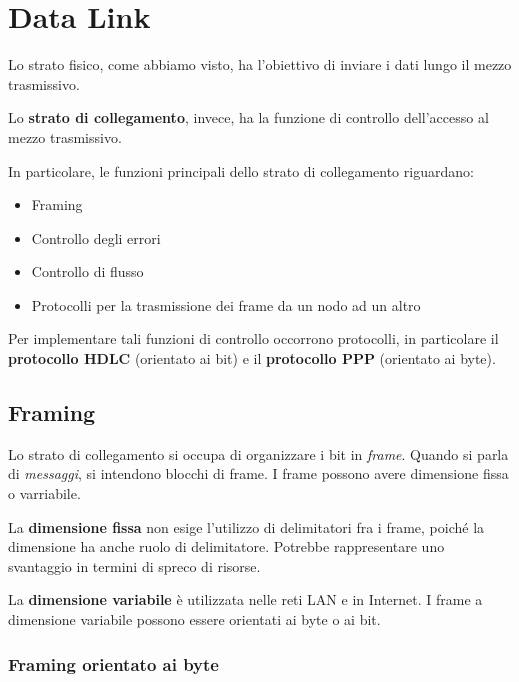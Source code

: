 \section{Data Link}

    Lo strato fisico, come abbiamo visto, ha l'obiettivo di inviare i dati lungo il mezzo trasmissivo. 
    
    Lo \textbf{strato di collegamento}, invece, ha la funzione di controllo dell'accesso al mezzo trasmissivo. 
    
    In particolare, le funzioni principali dello strato di collegamento riguardano:
    
    \begin{itemize}
        \item Framing
        \item Controllo degli errori
        \item Controllo di flusso
        \item Protocolli per la trasmissione dei frame da un nodo ad un altro
    \end{itemize}
    
    Per implementare tali funzioni di controllo occorrono protocolli, in particolare il \textbf{protocollo HDLC} (orientato ai bit) e il \textbf{protocollo PPP} (orientato ai byte).
    
    \subsection{Framing}
        Lo strato di collegamento si occupa di organizzare i bit in \textit{frame}. Quando si parla di \textit{messaggi}, si intendono blocchi di frame. I frame possono avere dimensione fissa o varriabile.
        
        \vspace{3mm}
        
        La \textbf{dimensione fissa} non esige l'utilizzo di delimitatori fra i frame, poiché la dimensione ha anche ruolo di delimitatore. Potrebbe rappresentare uno svantaggio in termini di spreco di risorse. 
        
        La \textbf{dimensione variabile} è utilizzata nelle reti LAN e in Internet. I frame a dimensione variabile possono essere orientati ai byte o ai bit.
        
        \subsubsection{Framing orientato ai byte}
        
